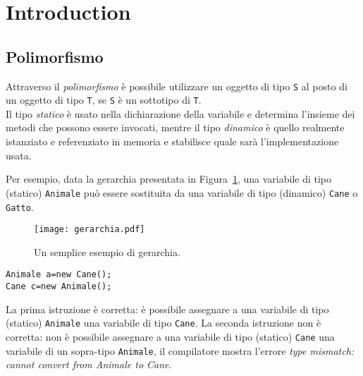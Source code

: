 \documentclass{article}
\author{\textbf{\hmwkAuthorName}}
\date{} %
\begin{document}
\maketitle



\newpage
\tableofcontents
\newpage



\section{Introduction}


\subsection{Polimorfismo}
Attraverso il \emph{polimorfismo} \`e possibile utilizzare un oggetto di tipo \texttt{S} al posto di un oggetto di tipo \texttt{T}, se \texttt{S} \`e un sottotipo di \texttt{T}.\\
Il tipo  \emph{statico} \`e usato nella dichiarazione della variabile e determina l'insieme dei metodi che possono essere invocati, mentre il tipo \emph{dinamico} \`e  quello realmente istanziato e referenziato in memoria e stabilisce quale sar\`a l'implementazione usata.

Per esempio, data la gerarchia presentata in Figura~\ref{Fig:gerarchy1}, una variabile di tipo (statico) \texttt{Animale} pu\`o essere sostituita da una variabile di tipo (dinamico) \texttt{Cane} o \texttt{Gatto}.

\begin{figure}[h!]
  \centering
    \texttt{[image: gerarchia.pdf]}
      \caption{Un semplice esempio di gerarchia.}
      \label{Fig:gerarchy1}
\end{figure}
\begin{lstlisting}
Animale a=new Cane();
Cane c=new Animale();
\end{lstlisting}
La prima istruzione \`e corretta: \`e possibile assegnare a una variabile di tipo (statico) \texttt{Animale} una variabile di tipo \texttt{Cane}.
La seconda istruzione non \`e corretta: non \`e possibile assegnare a una variabile di tipo (statico) \texttt{Cane} una variabile di un sopra-tipo \texttt{Animale}, il compilatore mostra l'errore \emph{type mismatch: cannot convert from Animale to Cane}.
\end{document}
